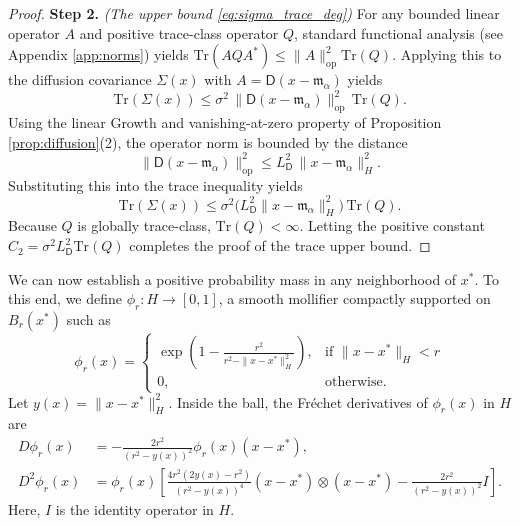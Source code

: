 \documentclass[12pt]{amsart}
\numberwithin{equation}{section}
\begin{document}
\begin{proof}
\textbf{Step 2.} \textit{(The upper bound \eqref{eq:sigma_trace_deg})} 
For any bounded linear operator $A$ and positive trace-class operator $Q$, standard functional analysis (see Appendix \ref{app:norms}) yields $\mathrm{Tr}(A Q A^*) \leq \|A\|_{\mathrm{op}}^2 \mathrm{Tr}(Q)$. Applying this to the diffusion covariance $\Sigma(x)$ with $A = \mathsf{D}(x - \mathfrak{m}_{\alpha})$ yields
\begin{equation*}
    \mathrm{Tr}(\Sigma(x)) \leq \sigma^2\, \|\mathsf{D}(x - \mathfrak{m}_{\alpha})\|_{\mathrm{op}}^2\, \mathrm{Tr}(Q).
\end{equation*}
Using the linear Growth and vanishing-at-zero property of Proposition \ref{prop:diffusion}(2), the operator norm is bounded by the distance
\begin{equation*}
    \|\mathsf{D}(x - \mathfrak{m}_{\alpha})\|_{\mathrm{op}}^2 \leq L_{\mathsf{D}}^2 \,\|x - \mathfrak{m}_{\alpha}\|_H^2. 
\end{equation*}
Substituting this into the trace inequality yields
\begin{equation}
    \mathrm{Tr}(\Sigma(x)) \leq \sigma^2 \Big( L_{\mathsf{D}}^2 \|x - \mathfrak{m}_{\alpha}\|_H^2 \Big) \,\mathrm{Tr}(Q).
\end{equation}
Because $Q$ is globally trace-class, $\mathrm{Tr}(Q) < \infty$. Letting the positive constant $C_2 = \sigma^2 L_{\mathsf{D}}^2 \mathrm{Tr}(Q)$  completes the proof of the trace upper bound. 
\end{proof}



We can now establish a positive probability mass in any neighborhood of $x^*$. To this end, we define $\phi_r: H \to [0,1]$, a smooth mollifier compactly supported on $B_r(x^*)$ such as
\begin{equation*}
    \phi_r(x) = \begin{cases} 
    \exp\left( 1 - \frac{r^2}{r^2 - \|x - x^*\|_H^2} \right), & \text{if } \|x - x^*\|_H < r \\ 
    0, & \text{otherwise.}
    \end{cases}
\end{equation*}
Let $y(x) = \|x - x^*\|_H^2$. Inside the ball, the Fr\'echet derivatives of $\phi_r(x)$ in $H$ are 
\begin{align*}
    D\phi_r(x) &= -\frac{2r^2}{(r^2 - y(x))^2} \phi_r(x) (x - x^*), \\
    D^2\phi_r(x) &= \phi_r(x) \left[ \frac{4r^2 (2y(x)-r^{2})}{(r^2 - y(x))^4} (x - x^*) \otimes (x - x^*) - \frac{2r^2}{(r^2 - y(x))^2} I \right]. 
\end{align*}
Here, $I$ is the identity operator in $H$. 
\end{document}
